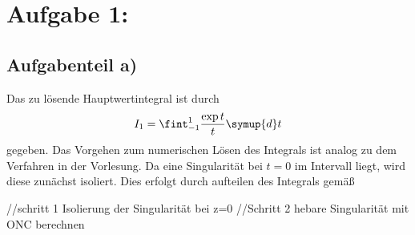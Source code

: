 \section*{Aufgabe 1: }

\subsection*{Aufgabenteil a)}
Das zu lösende Hauptwertintegral ist durch
\begin{equation}
  I_1= \fint_{-1}^1 \frac{\exp{t}}{t} \symup{d}t
\end{equation}
gegeben. Das Vorgehen zum numerischen Lösen des Integrals ist analog zu dem Verfahren in der Vorlesung.
Da eine Singularität bei $t=0$ im Intervall liegt, wird diese zunächst isoliert.
Dies erfolgt durch aufteilen des Integrals gemäß





  //schritt 1 Isolierung der Singularität bei z=0
  //Schritt 2 hebare Singularität mit ONC berechnen
